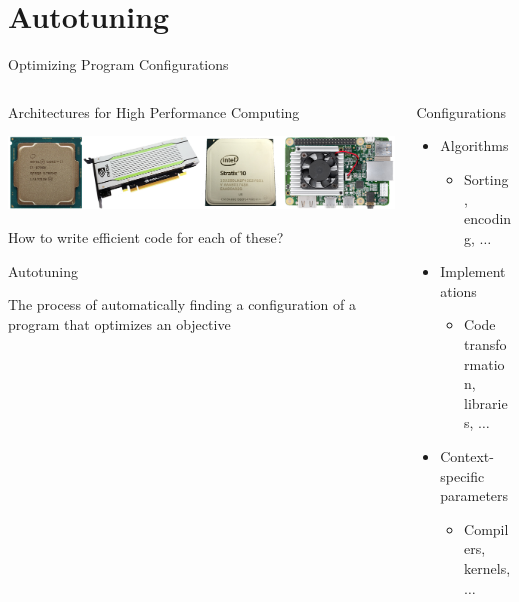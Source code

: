 \documentclass[10pt, compress, aspectratio=169, xcolor={table,usenames,dvipsnames}]{beamer}
\begin{document}
\section{Autotuning}
\label{sec:orga4d0ccd}
\begin{frame}[label={sec:org458b662}]{Optimizing Program Configurations}
\begin{columns}
\begin{column}{0.5\columnwidth}
\begin{block}{Architectures for High Performance Computing}
\begin{center}
\includegraphics[width=\columnwidth]{../../../img/architectures_2.png}
\end{center}

How to write \alert{efficient code} for each of these?

\begin{block}{Autotuning}
\vspace{.2cm}

The process of automatically finding a \mbox{\alert{configuration}} of a program
that optimizes an \mbox{\alert{objective}}
\end{block}
\end{block}
\end{column}

\begin{column}{0.5\columnwidth}
\begin{block}{Configurations}
\begin{itemize}
\item Algorithms
\begin{itemize}
\item Sorting, encoding, \(\dots\)
\end{itemize}
\item Implementations
\begin{itemize}
\item Code transformation, libraries, \(\dots\)
\end{itemize}
\item Context-specific parameters
\begin{itemize}
\item Compilers, kernels, \(\dots\)
\end{itemize}
\end{itemize}


\end{block}
\end{column}
\end{columns}
\end{frame}
\end{document}
